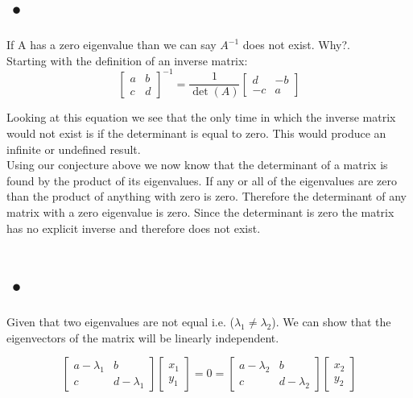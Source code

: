 \documentclass[12pt]{article}
\begin{document}
\section{•}

If A has a zero eigenvalue than we can say $A^{-1}$ does not exist. Why?.\\
Starting with the definition of an inverse matrix:
\[
\begin{bmatrix}
a & b\\
c & d
\end{bmatrix}
^{-1}
=
\frac{1}{\det (A)}
\begin{bmatrix}
d & -b\\
-c & a
\end{bmatrix}
\]

Looking at this equation we see that the only time in which the inverse matrix would not exist is if the determinant is equal to zero. This would produce an infinite or undefined result.\\

Using our conjecture above we now know that the determinant of a matrix is found by the product of its eigenvalues. If any or all of the eigenvalues are zero than the product of anything with zero is zero. Therefore the determinant of any matrix with a zero eigenvalue is zero. Since the determinant is zero the matrix has no explicit inverse and therefore does not exist.

\section{•}

Given that two eigenvalues are not equal i.e. ($\lambda_1 \not = \lambda_2$). We can show that the eigenvectors of the matrix will be linearly independent. 

\[
\begin{bmatrix}
a - \lambda_1 & b\\
c & d - \lambda_1
\end{bmatrix}
\begin{bmatrix}
x_1\\
y_1
\end{bmatrix}
= 0
=
\begin{bmatrix}
a - \lambda_2 & b\\
c & d - \lambda_2
\end{bmatrix}
\begin{bmatrix}
x_2\\
y_2
\end{bmatrix}
\] 
\end{document}
